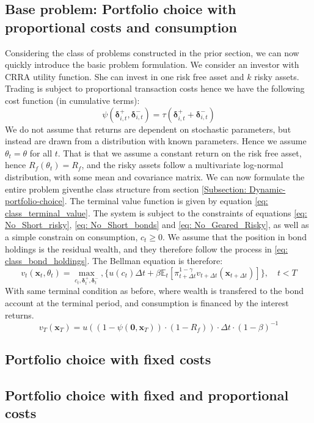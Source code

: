 \documentclass[11pt]{article}
\begin{document}
\subsection{Base problem: Portfolio choice with proportional costs and consumption}\label{Subsection: Base_Problem}
Considering the class of problems constructed in the prior section,
we can now quickly introduce the basic problem formulation.
We consider an investor with CRRA utility function. She can invest in one risk free asset and $k$ risky assets.
Trading is subject to proportional transaction costs hence we have the following cost function (in cumulative terms):
\begin{equation} \label{eq: base_model_transaction-cost}
  \psi (\boldsymbol{\delta}^{+}_{i,t}, \boldsymbol{\delta}^{-}_{i,t} ) = \tau (\boldsymbol{\delta}^{+}_{i,t} + \boldsymbol{\delta}^{-}_{i,t}) 
\end{equation}
We do not assume that returns are dependent on stochastic parameters, but instead are drawn from a distribution with known parameters.
Hence we assume \( \theta_{t} = \theta \) for all $t$. That is that we assume a constant return on the risk free asset, hence $R_{f}(\theta_t) = R_{f}$,
and the risky assets follow a multivariate log-normal distribution, with some mean and covariance matrix.
We can now formulate the entire problem giventhe class structure from section \ref{Subsection: Dynamic-portfolio-choice}.
The terminal value function is given by equation \eqref{eq: class_terminal_value}. 
The system is subject to the constraints of equations \eqref{eq: No_Short_risky}, \eqref{eq: No_Short_bonds} and \eqref{eq: No_Geared_Risky},
as well as a simple constrain on consumption, $c_t \geq 0$.
We assume that the position in bond holdings is the residual wealth, and they therefore follow the process
in \eqref{eq: class_bond_holdings}. The Bellman equation is therefore:
\[  
  v_{t} (\mathbf{x}_{t}, \theta_t) = \max_{c_t , \boldsymbol{\delta}^{+}_{t}, \boldsymbol{\delta}^{-}_{t}  },  \{ u(c_t) 
  \Delta t + \beta \mathbb{E}_{t} \left[ 
    \pi_{t+\Delta t}^{1-\gamma}
    v_{t+\Delta t} (\mathbf{x}_{t+\Delta t }) 
    \right] \} , \quad t < T 
\]
With same terminal condition as before, where wealth is transfered to the bond account at the terminal period, 
and consumption is financed by the interest returns.
\[
  v_T (\mathbf{x}_T) = u ( (1 - \psi( \mathbf{0},\mathbf{x}_T)) \cdot (1-R_f) )\cdot \Delta t \cdot (1-\beta)^{-1} 
\]

\subsection{Portfolio choice with fixed costs}
\subsection{Portfolio choice with fixed and proportional costs}


\ifdefined\COMPILINGMAIN
\else
\printbibliography
\end{document}
